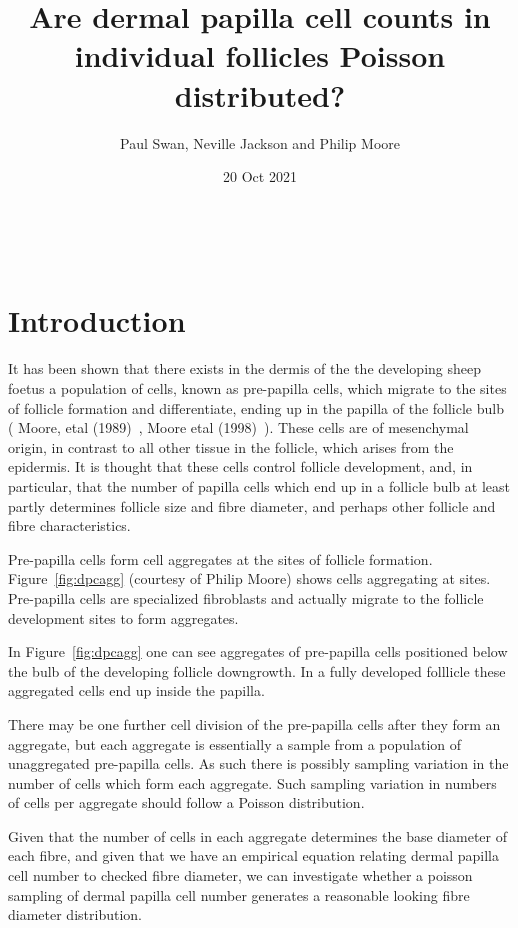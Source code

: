 \documentclass[titlepage]{article}  %
\title{Are dermal papilla cell counts in individual follicles Poisson distributed?}
\author{Paul Swan, Neville Jackson and Philip Moore}
\date{20 Oct 2021}
\begin{document}
 


 
\maketitle      
\tableofcontents

$\newcommand{\E}{\mathrm{E}}$
$\newcommand{\Var}{\mathrm{Var}}$
$\newcommand{\Cov}{\mathrm{Cov}}$ 
$\newcommand{\SD}{\mathrm{SD}}$ 

\clearpage
\section{Introduction} 
It has been shown that there  exists in the dermis of the the developing sheep foetus a population of cells, known as pre-papilla cells, which migrate to the sites of follicle formation and differentiate, ending up in the papilla of the follicle bulb ( Moore, etal (1989)~\cite{moor:89}, Moore etal (1998)~\cite{moor:98}). These cells are of mesenchymal origin, in contrast to all other tissue in the follicle, which arises from the epidermis. It is thought that these cells control follicle development, and, in particular, that the number of papilla cells which end up in a follicle bulb  at least partly determines follicle size and fibre diameter, and perhaps other follicle and fibre characteristics.

Pre-papilla cells form cell aggregates at the sites of follicle formation. Figure~\ref{fig:dpcagg} (courtesy of Philip Moore) shows cells aggregating at sites.
Pre-papilla cells are specialized fibroblasts and actually migrate to the follicle development sites to form aggregates. 

In Figure~\ref{fig:dpcagg} one can see aggregates of pre-papilla cells positioned below the bulb of the developing follicle downgrowth.  In a fully developed folllicle these aggregated cells end up inside the papilla.

There may be one further cell division of the pre-papilla cells after they form an aggregate, but each aggregate is essentially a sample from a population of unaggregated pre-papilla cells. As such there is possibly sampling variation in the number of cells which form each aggregate. Such sampling variation in numbers of cells per aggregate should follow a Poisson distribution.

Given that the number of cells in each aggregate determines the base diameter of each fibre, and given that we have an empirical equation relating dermal papilla cell number to checked fibre diameter, we can investigate whether a poisson sampling of dermal papilla cell number generates a reasonable looking fibre diameter distribution.
\end{document}
